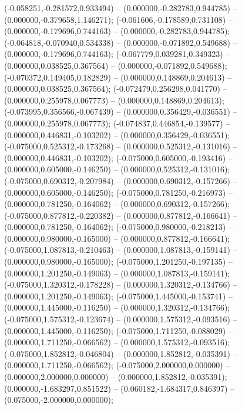  (-0.058251,-0.281572,0.933494) -- (0.000000,-0.282783,0.944785) -- (0.000000,-0.379658,1.146271);
 (-0.061606,-0.178589,0.731108) -- (0.000000,-0.179696,0.744163) -- (0.000000,-0.282783,0.944785);
 (-0.064818,-0.070940,0.534338) -- (0.000000,-0.071892,0.549688) -- (0.000000,-0.179696,0.744163);
 (-0.067779,0.039281,0.349323) -- (0.000000,0.038525,0.367564) -- (0.000000,-0.071892,0.549688);
 (-0.070372,0.149405,0.182829) -- (0.000000,0.148869,0.204613) -- (0.000000,0.038525,0.367564);
 (-0.072479,0.256298,0.041770) -- (0.000000,0.255978,0.067773) -- (0.000000,0.148869,0.204613);
 (-0.073995,0.356566,-0.067439) -- (0.000000,0.356429,-0.036551) -- (0.000000,0.255978,0.067773);
 (-0.074837,0.446854,-0.139577) -- (0.000000,0.446831,-0.103202) -- (0.000000,0.356429,-0.036551);
 (-0.075000,0.525312,-0.173268) -- (0.000000,0.525312,-0.131016) -- (0.000000,0.446831,-0.103202);
 (-0.075000,0.605000,-0.193416) -- (0.000000,0.605000,-0.146250) -- (0.000000,0.525312,-0.131016);
 (-0.075000,0.690312,-0.207984) -- (0.000000,0.690312,-0.157266) -- (0.000000,0.605000,-0.146250);
 (-0.075000,0.781250,-0.216973) -- (0.000000,0.781250,-0.164062) -- (0.000000,0.690312,-0.157266);
 (-0.075000,0.877812,-0.220382) -- (0.000000,0.877812,-0.166641) -- (0.000000,0.781250,-0.164062);
 (-0.075000,0.980000,-0.218213) -- (0.000000,0.980000,-0.165000) -- (0.000000,0.877812,-0.166641);
 (-0.075000,1.087813,-0.210463) -- (0.000000,1.087813,-0.159141) -- (0.000000,0.980000,-0.165000);
 (-0.075000,1.201250,-0.197135) -- (0.000000,1.201250,-0.149063) -- (0.000000,1.087813,-0.159141);
 (-0.075000,1.320312,-0.178228) -- (0.000000,1.320312,-0.134766) -- (0.000000,1.201250,-0.149063);
 (-0.075000,1.445000,-0.153741) -- (0.000000,1.445000,-0.116250) -- (0.000000,1.320312,-0.134766);
 (-0.075000,1.575312,-0.123674) -- (0.000000,1.575312,-0.093516) -- (0.000000,1.445000,-0.116250);
 (-0.075000,1.711250,-0.088029) -- (0.000000,1.711250,-0.066562) -- (0.000000,1.575312,-0.093516);
 (-0.075000,1.852812,-0.046804) -- (0.000000,1.852812,-0.035391) -- (0.000000,1.711250,-0.066562);
 (-0.075000,2.000000,0.000000) -- (0.000000,2.000000,0.000000) -- (0.000000,1.852812,-0.035391);
 (0.000000,-1.683297,0.851522) -- (0.060182,-1.684317,0.846397) -- (0.075000,-2.000000,0.000000);
